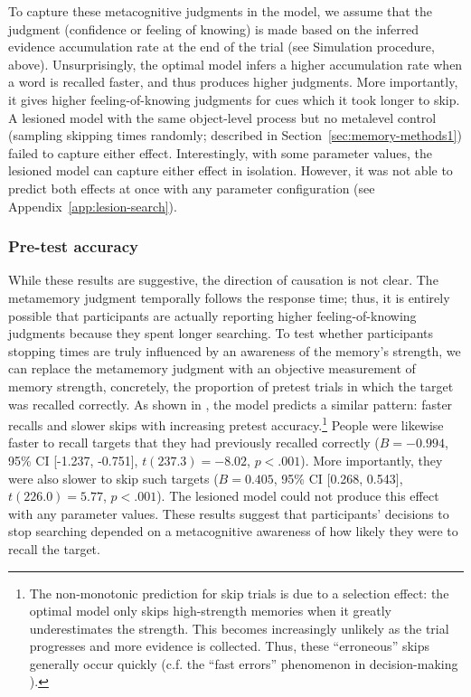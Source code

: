 To capture these metacognitive judgments in the model, we assume that the judgment (confidence or feeling of knowing) is made based on the inferred evidence accumulation rate at the end of the trial (see Simulation procedure, above). Unsurprisingly, the optimal model infers a higher accumulation rate when a word is recalled faster, and thus produces higher judgments. More importantly, it gives higher feeling-of-knowing judgments for cues which it took longer to skip. A lesioned model with the same object-level process but no metalevel control (sampling skipping times randomly; described in Section~\ref{sec:memory-methods1}) failed to capture either effect. Interestingly, with some parameter values, the lesioned model can capture either effect in isolation. However, it was not able to predict both effects at once with any parameter configuration (see Appendix~\ref{app:lesion-search}).

\subsubsection{Pre-test accuracy}

While these results are suggestive, the direction of causation is not clear. The metamemory judgment temporally follows the response time; thus, it is entirely possible that participants are actually reporting higher feeling-of-knowing judgments because they spent longer searching. To test whether participants stopping times are truly influenced by an awareness of the memory's strength, we can replace the metamemory judgment with an objective measurement of memory strength, concretely, the proportion of pretest trials in which the target was recalled correctly. As shown in , the model predicts a similar pattern: faster recalls and slower skips with increasing pretest accuracy.\footnote{%
    The non-monotonic prediction for skip trials is due to a selection effect: the optimal model only skips high-strength memories when it greatly underestimates the strength. This becomes increasingly unlikely as the trial progresses and more evidence is collected. Thus, these ``erroneous'' skips generally occur quickly (c.f. the ``fast errors'' phenomenon in decision-making  \citealp{ratcliff1998modeling}).
    }
People were likewise faster to recall targets that they had previously recalled correctly ($B = -0.994$, 95\% CI [-1.237, -0.751], $t(237.3)=-8.02$, $p < .001$). More importantly, they were also slower to skip such targets ($B = 0.405$, 95\% CI [0.268, 0.543], $t(226.0)=5.77$, $p < .001$). The lesioned model could not produce this effect with any parameter values. These results suggest that participants' decisions to stop searching depended on a metacognitive awareness of how likely they were to recall the target.

